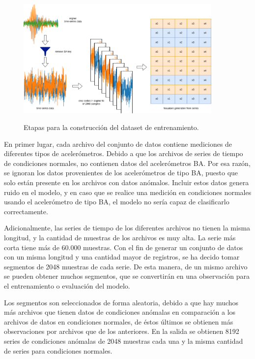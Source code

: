 \documentclass[11pt,a4paper,spanish]{book}
\numberwithin{equation}{chapter}
\numberwithin{figure}{chapter}
\begin{document}
\begin{figure}[h]
    \caption{Etapas para la construcción del dataset de entrenamiento.}
    \centering
    \includegraphics[width=0.9\textwidth]{media/generacion-dataset.drawio.png}
    \label{fig:figGenerationDataset}
\end{figure}


En primer lugar, cada archivo del conjunto de datos contiene mediciones de diferentes 
tipos de acelerómetros. Debido a que los archivos de series de tiempo de condiciones 
normales, no contienen datos del acelerómetros BA. Por esa razón, se ignoran los datos 
provenientes de los acelerómetros de tipo BA, puesto que solo están presente en los 
archivos con datos anómalos. Incluir estos datos genera ruido en el modelo, y en caso 
que se realice una medición en condiciones normales usando el acelerómetro de tipo BA, 
el modelo no sería capaz de clasificarlo correctamente.


Adicionalmente, las series de tiempo de los diferentes archivos no tienen la misma 
longitud, y la cantidad de muestras de los archivos es muy alta. La serie más corta 
tiene más de 60.000 muestras. Con el fin de generar un conjunto de datos con un misma 
longitud y una cantidad mayor de registros, se ha decido tomar segmentos de 2048 
muestras de cada serie.  De esta manera, de un mismo archivo se pueden obtener muchos 
segmentos, que se convertirán en una observación para el entrenamiento o evaluación 
del modelo. 


Los segmentos son seleccionados de forma aleatoria, debido a que hay muchos más archivos 
que tienen datos de condiciones anómalas en comparación a los archivos de datos en 
condiciones normales, de éstos últimos se obtienen más observaciones por archivos que 
de los anteriores. En la salida se obtienen 8192 series de condiciones anómalas de 2048 
muestras cada una y la misma cantidad de series para condiciones normales. 
\end{document}
